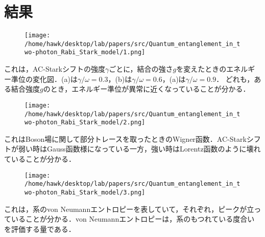 \documentclass{report}
\begin{document}
    \section{結果}
      \begin{figure}[H]
        \centering
        \texttt{[image: /home/hawk/desktop/lab/papers/src/Quantum\_entanglement\_in\_two-photon\_Rabi\_Stark\_model/1.png]}
      \end{figure}
      これは，AC-Starkシフトの強度$\gamma$ごとに，結合の強さ$g$を変えたときのエネルギー準位の変化図．(a)は$\gamma/\omega = 0.3$，(b)は$\gamma/\omega = 0.6$，(a)は$\gamma/\omega = 0.9$．
      どれも，ある結合強度$g$のとき，エネルギー準位が異常に近くなっていることが分かる．
      \begin{figure}[H]
        \centering
        \texttt{[image: /home/hawk/desktop/lab/papers/src/Quantum\_entanglement\_in\_two-photon\_Rabi\_Stark\_model/2.png]}
      \end{figure}
      これはBoson場に関して部分トレースを取ったときのWigner函数．AC-Starkシフトが弱い時はGauss函数様になっている一方，強い時はLorentz函数のように壊れていることが分かる．
      \begin{figure}[H]
        \centering
        \texttt{[image: /home/hawk/desktop/lab/papers/src/Quantum\_entanglement\_in\_two-photon\_Rabi\_Stark\_model/3.png]}
      \end{figure}
      これは，系のvon Neumannエントロピーを表していて，それぞれ，ピークが立っていることが分かる．von Neumannエントロピーは，系のもつれている度合いを評価する量である．
\end{document}
